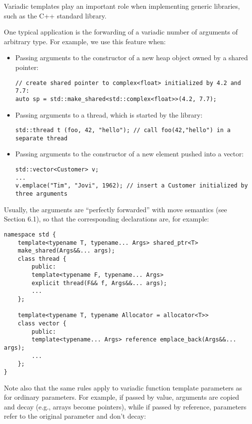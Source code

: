Variadic templates play an important role when implementing generic libraries, such as the C++ standard library.

One typical application is the forwarding of a variadic number of arguments of arbitrary type. For example, we use this feature when:

\begin{itemize}
\item 
Passing arguments to the constructor of a new heap object owned by a shared pointer:
\begin{lstlisting}[style=styleCXX]
// create shared pointer to complex<float> initialized by 4.2 and 7.7:
auto sp = std::make_shared<std::complex<float>>(4.2, 7.7);
\end{lstlisting}

\item 
Passing arguments to a thread, which is started by the library:
\begin{lstlisting}[style=styleCXX]
std::thread t (foo, 42, "hello"); // call foo(42,"hello") in a separate thread
\end{lstlisting}

\item 
Passing arguments to the constructor of a new element pushed into a vector:
\begin{lstlisting}[style=styleCXX]
std::vector<Customer> v;
...
v.emplace("Tim", "Jovi", 1962); // insert a Customer initialized by three arguments
\end{lstlisting}

\end{itemize}

Usually, the arguments are “perfectly forwarded” with move semantics (see Section 6.1), so that the corresponding declarations are, for example:

\begin{lstlisting}[style=styleCXX]
namespace std {
	template<typename T, typename... Args> shared_ptr<T>
	make_shared(Args&&... args);
	class thread {
		public:
		template<typename F, typename... Args>
		explicit thread(F&& f, Args&&... args);
		...
	};

	template<typename T, typename Allocator = allocator<T>>
	class vector {
		public:
		template<typename... Args> reference emplace_back(Args&&... args);
		...
	};
}
\end{lstlisting}

Note also that the same rules apply to variadic function template parameters as for ordinary parameters. For example, if passed by value, arguments are copied and decay (e.g., arrays become pointers), while if passed by reference, parameters refer to the original parameter and don’t decay:

